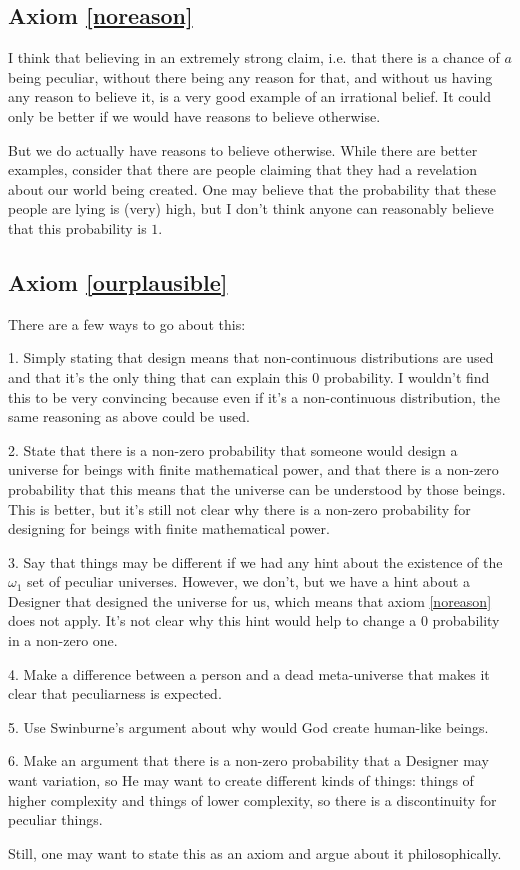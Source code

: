\documentclass[a4paper
,draft
]{article}
\def\infordinalb{\omega_1}
\begin{document}
\subsection{Axiom \ref{noreason}}

I think that believing in an extremely strong claim, i.e. that there is a chance of $a$ being peculiar, without there being any reason for that, and without us having any reason to believe it, is a very good example of an irrational belief. It could only be better if we would have reasons to believe otherwise.

But we do actually have reasons to believe otherwise. While there are better examples, consider that there are people claiming that they had a revelation about our world being created. One may believe that the probability that these people are lying is (very) high, but I don't think anyone can reasonably believe that this probability is $1$.

\subsection{Axiom \ref{ourplausible}}

There are a few ways to go about this:

1. Simply stating that design means that non-continuous distributions are used and that it's the only thing that can explain this 0 probability. I wouldn't find this to be very convincing because even if it's a non-continuous distribution, the same reasoning as above could be used.

2. State that there is a non-zero probability that someone would design a universe for beings with finite mathematical power, and that there is a non-zero probability that this means that the universe can be understood by those beings. This is better, but it's still not clear why there is a non-zero probability for designing for beings with finite mathematical power.

3. Say that things may be different if we had any hint about the existence of the $\infordinalb$ set of peculiar universes. However, we don't, but we have a hint about a Designer that designed the universe for us, which means that axiom \ref{noreason} does not apply. It's not clear why this hint would help to change a $0$ probability in a non-zero one.

4. Make a difference between a person and a dead meta-universe that makes it clear that peculiarness is expected.

5. Use Swinburne's argument about why would God create human-like beings.

6. Make an argument that there is a non-zero probability that a Designer may want variation, so He may want to create different kinds of things: things of higher complexity and things of lower complexity, so there is a discontinuity for peculiar things.

Still, one may want to state this as an axiom and argue about it philosophically.
\end{document}
